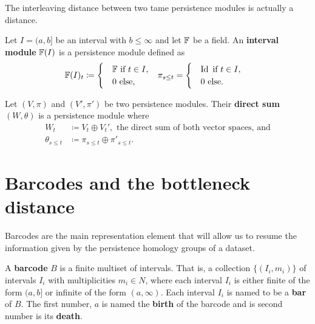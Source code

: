 \begin{proposition}
    The interleaving distance between two tame persistence modules is actually a distance.
\end{proposition}

\begin{definition}
    Let $ I = (a, b] $ be an interval with $ b \leq \infty $ and let $ \mathbb F $ be a field. An {\bf interval module} $\mathbb F(I)$ is a persistence module defined as
    \begin{align}
        & \mathbb F(I)_t \coloneq \begin{cases}
            &\mathbb F \text{ if } t \in I, \\
            &0 \text{ else}, 
        \end{cases}
        &
        & \pi_{s \leq t} = \begin{cases}
            & \operatorname{Id} \text{ if } t \in I, \\
            &0 \text{ else}.
        \end{cases}
    \end{align}
\end{definition}

\begin{definition}
    Let $ (V, \pi) $ and $ (V', \pi') $ be two persistence modules. Their {\bf direct sum} $ (W, \theta) $ is a persistence module where
    \begin{align}
        W_t &\coloneq V_t \oplus V_t', \text{ the direct sum of both vector spaces, and} \\
        \theta_{s \leq t} &\coloneq \pi_{s \leq t} \oplus \pi'_{s \leq t}.
    \end{align}
\end{definition}

\section{Barcodes and the bottleneck distance} \label{sec:preliminaries-barcodes}
Barcodes are the main representation element that will allow us to resume the information given by the persistence homology groups of a dataset.

\begin{definition}[Barcode]
    A {\bf barcode} $B$ is a finite multiset of intervals. That is, a collection $\{(I_i, m_i)\}$ of intervals $I_i$ with multiplicities $m_i \in N$, where each interval $ I_i $ is either finite of the form $(a, b]$ or infinite of the form $(a, \infty)$. Each interval $I_i$ is named to be a {\bf bar} of $B$. The first number, $ a $ is named the {\bf birth} of the barcode and is second number is its {\bf death}.
\end{definition}

